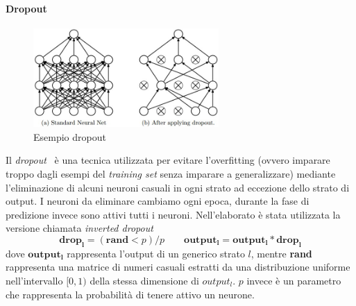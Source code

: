 \documentclass[11pt,a4paper,twoside,
openright]{book}
\newcommand{\matr}[1]{\mathbf{#1}}
\begin{document}
\paragraph*{Dropout}
\begin{figure}[h!]
\begin{center}
\includegraphics[width=200pt]{dropout.jpeg}
\caption{Esempio dropout~\cite{10.5555/2627435.2670313}} 
\end{center}
\label{fig:dropout}
\end{figure}
Il \textit{dropout}~\cite{10.5555/2627435.2670313} è una tecnica utilizzata per evitare l'overfitting (ovvero imparare troppo dagli esempi del \textit{training set} senza imparare a generalizzare) mediante l'eliminazione di alcuni neuroni casuali in ogni strato ad eccezione dello strato di output. I neuroni da eliminare cambiamo ogni epoca, durante la fase di predizione invece sono attivi tutti i neuroni.
Nell'elaborato è stata utilizzata la versione chiamata \textit{inverted dropout}
\begin{equation}
\matr{drop_l}=(\matr{rand} < p)/p  \qquad
\matr{output_l}=\matr{output_l} * \matr{drop_l}
\label{drop}
\end{equation}
dove $\matr{output_l}$ rappresenta l'output di un generico strato $l$, mentre \textbf{rand} rappresenta una matrice di numeri casuali estratti da una distribuzione uniforme nell'intervallo $[0,1)$ della stessa dimensione di \textbf{$output_l$}. $p$ invece è un parametro che rappresenta la probabilità di tenere attivo un neurone.
\end{document}
